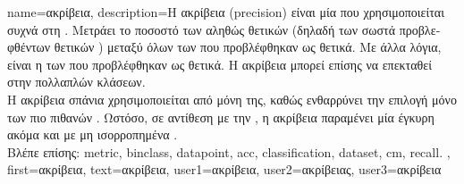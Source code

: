 {name={\foreignlanguage{greek}{ακρίβεια}}, 
	description={\foreignlanguage{greek}{Η ακρίβεια} (precision) 
		\foreignlanguage{greek}{είναι μία}  \foreignlanguage{greek}{που χρησιμοποιείται 
		συχνά στη} . 
		\foreignlanguage{greek}{Μετράει το ποσοστό των αληθώς θετικών (δηλαδή των σωστά  
		προβλεφθέντων θετικών} ) \foreignlanguage{greek}{μεταξύ όλων των} 
		 \foreignlanguage{greek}{που προβλέφθηκαν ως θετικά. Με άλλα λόγια, 
		είναι η}  \foreignlanguage{greek}{των}  \foreignlanguage{greek}{που 
		προβλέφθηκαν ως θετικά. Η ακρίβεια μπορεί επίσης να επεκταθεί στην}  
		\foreignlanguage{greek}{πολλαπλών κλάσεων}. \\
		\foreignlanguage{greek}{Η ακρίβεια σπάνια χρησιμοποιείται από μόνη της, καθώς ενθαρρύνει την επιλογή 
		μόνο των πιο πιθανών} . %
		\foreignlanguage{greek}{Ωστόσο, σε αντίθεση με την} , \foreignlanguage{greek}{η ακρίβεια
		παραμένει μία έγκυρη}  \foreignlanguage{greek}{ακόμα και με μη ισορροπημένα} 
		. %
		\\ 
		\foreignlanguage{greek}{Βλέπε επίσης:} \gls{metric}, \gls{binclass}, \gls{datapoint}, \gls{acc}, \gls{classification}, 
		\gls{dataset}, \gls{cm}, \gls{recall}. },
	first={\foreignlanguage{greek}{ακρίβεια}}, 
	text={\foreignlanguage{greek}{ακρίβεια}},
	user1={\foreignlanguage{greek}{ακρίβεια}}, %
	user2={\foreignlanguage{greek}{ακρίβειας}}, %
	user3={\foreignlanguage{greek}{ακρίβεια}} %
}

